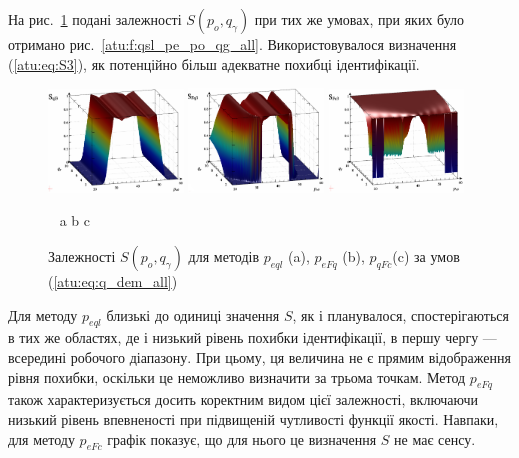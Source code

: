 На рис.~\ref{atu:f:qsl_S_po_qg_all} подані залежності
$S (p_o, q_\gamma)$
при тих же умовах, при яких було отримано рис.~\ref{atu:f:qsl_pe_po_qg_all}.
Використовувалося визначення (\ref{atu:eq:S3}), як
потенційно більш адекватне похибці ідентифікації.

\begin{figure}[htb!]
  \begin{center}
    \includegraphics[width=0.32\textwidth]{p/qls_pe-p_po_qg_Sql_all_xl.png}
    \hfill
    \includegraphics[width=0.32\textwidth]{p/qls_pe-p_po_qg_SFq_all_xl.png}
    \hfill
    \includegraphics[width=0.32\textwidth]{p/qls_pe-p_po_qg_SFc_all_xl.png}
  \end{center}
  \vspace{-1.0ex}
  \begin{center}
    ~ \hfill a \hfill\hfill b \hfill\hfill c \hfill ~
  \end{center}
  \vspace{-1.5ex}
  \caption{Залежності $S(p_o,q_\gamma)$ для методів $p_{eql}$ (a), $p_{eFq}$ (b), $p_{qFc}$(c) за умов (\ref{atu:eq:q_dem_all})}
  \label{atu:f:qsl_S_po_qg_all}
\end{figure}

Для методу $p_{eql}$ близькі до одиниці значення $S$, як і планувалося,
спостерігаються в тих же областях, де і низький рівень похибки ідентифікації, в
першу чергу --- всередині робочого діапазону. При цьому, ця величина не є
прямим відображення рівня похибки, оскільки це неможливо визначити за трьома точкам.
Метод $p_{eFq}$ також характеризується досить коректним видом цієї залежності,
включаючи низький рівень впевненості при підвищеній чутливості функції якості.
Навпаки, для методу $p_{eFc}$ графік показує, що для нього це визначення $S$ не має сенсу.


